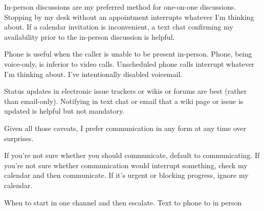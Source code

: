 In-person discussions are my preferred method for one-on-one discussions. Stopping by my desk  without an appointment interrupts whatever I'm thinking about. If a calendar invitation is inconvenient, a text chat confirming my availability prior to the in-person discussion is helpful. 

Phone is useful when the caller is unable to be present in-person. Phone, being voice-only, is inferior to video calls. Unscheduled phone calls interrupt whatever I'm thinking about. I've intentionally disabled voicemail. 

Status updates in electronic issue trackers or wikis or forums are best (rather than email-only). Notifying in text chat or email that a wiki page or issue is updated is helpful but not mandatory. 

Given all those caveats, I prefer communication in any form at any time over surprises. 

If you're not sure whether you should communicate, default to communicating. If you're not sure whether communication would interrupt something, check my calendar and then communicate. If it's urgent or blocking progress, ignore my calendar. 

 When to start in one channel and then escalate. Text to phone to in person 
